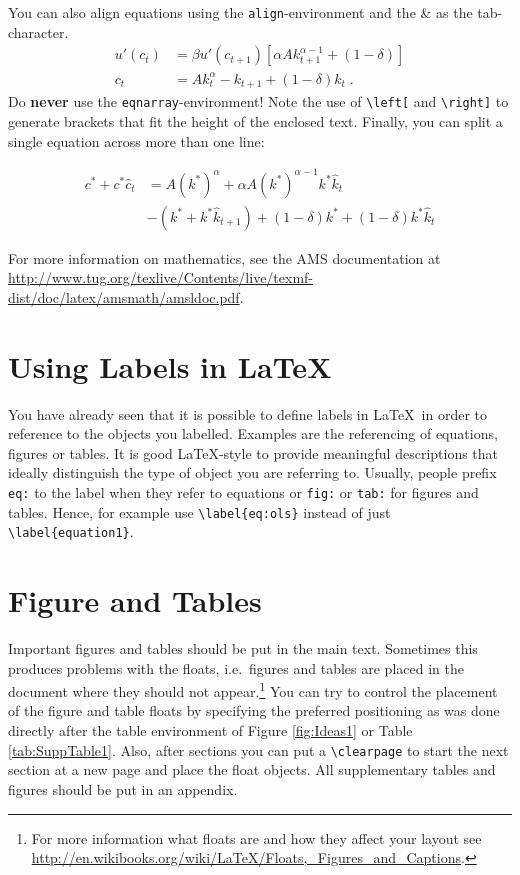 \documentclass[a4paper,12pt]{scrartcl} %
\begin{document}
You can also align equations using the \texttt{align}-environment and the \& as the tab-character.
\begin{align}
    u'(c_t)&= \beta u'(c_{t+1}) \left[\alpha A k_{t+1}^{\alpha-1} +(1-\delta)\right] \label{euler}\\
    c_t &=Ak_t^{\alpha} - k_{t+1} + (1-\delta)k_t \;.\label{ressource}
\end{align}
Do \textbf{never} use the \texttt{eqnarray}-environment! Note the use of \verb|\left[| and \verb|\right]| to generate brackets that fit the height of the enclosed text. Finally, you can split a single equation across more than one line:

\begin{equation}
    \begin{split}
        c^* + c^* \hat{c}_{t} &= A\left(k^*\right)^{\alpha} + \alpha A \left(k^*\right)^{\alpha-1} k^* \hat{k}_t \\
                              &- \left( k^* + k^* \hat{k}_{t+1}\right) + (1-\delta)k^* + (1-\delta) k^* \hat{k}_t
    \end{split}
\end{equation}

For more information on mathematics, see the AMS documentation at \url{http://www.tug.org/texlive/Contents/live/texmf-dist/doc/latex/amsmath/amsldoc.pdf}.

\section{Using Labels in \LaTeX}

You have already seen that it is possible to define labels in \LaTeX\ in order to reference to the objects you labelled. Examples are the referencing of equations, figures or tables. It is good \LaTeX-style to provide meaningful descriptions that ideally distinguish the type of object you are referring to. Usually, people prefix \texttt{eq:} to the label when they refer to equations or \texttt{fig:} or \texttt{tab:} for figures and tables. Hence, for example use \verb|\label{eq:ols}| instead of just \verb|\label{equation1}|.

\section{Figure and Tables}

Important figures and tables should be put in the main text. Sometimes this produces problems with the floats, i.e.\ figures and tables are placed in the document where they should not appear.\footnote{For more information what floats are and how they affect your layout see \url{http://en.wikibooks.org/wiki/LaTeX/Floats,_Figures_and_Captions}.} You can try to control the placement of the figure and table floats by specifying the preferred positioning as was done directly after the table environment of Figure \ref{fig:Ideas1} or Table \ref{tab:SuppTable1}. Also, after sections you can put a \verb|\clearpage| to start the next section at a new page and place the float objects. All supplementary tables and figures should be put in an appendix.\\
\end{document}
